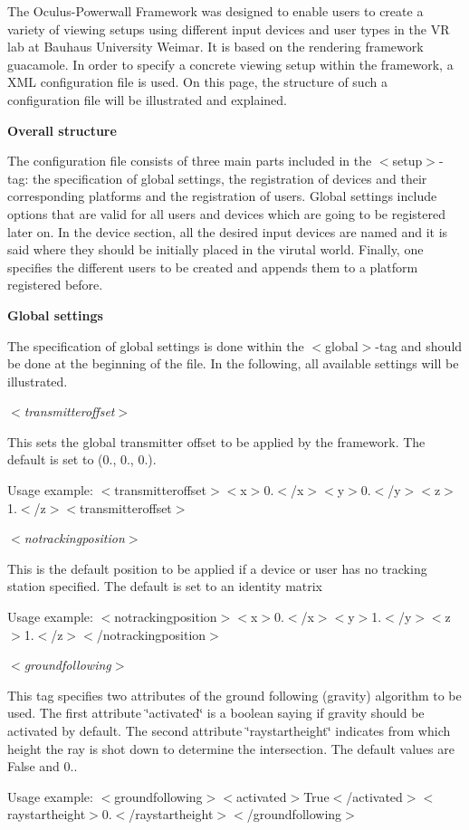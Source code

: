 \-The \-Oculus-\/\-Powerwall \-Framework was designed to enable users to create a variety of viewing setups using different input devices and user types in the \-V\-R lab at \-Bauhaus \-University \-Weimar. \-It is based on the rendering framework guacamole. \-In order to specify a concrete viewing setup within the framework, a \-X\-M\-L configuration file is used. \-On this page, the structure of such a configuration file will be illustrated and explained.

\par
 {\bfseries \-Overall structure}\par
 \-The configuration file consists of three main parts included in the $<$setup$>$-\/tag\-: the specification of global settings, the registration of devices and their corresponding platforms and the registration of users. \-Global settings include options that are valid for all users and devices which are going to be registered later on. \-In the device section, all the desired input devices are named and it is said where they should be initially placed in the virutal world. \-Finally, one specifies the different users to be created and appends them to a platform registered before.\par
\par


{\bfseries \-Global settings}\par
 \-The specification of global settings is done within the $<$global$>$-\/tag and should be done at the beginning of the file. \-In the following, all available settings will be illustrated.

{\itshape $<$transmitteroffset$>$\/}\par
 \-This sets the global transmitter offset to be applied by the framework. \-The default is set to (0., 0., 0.).\par
 \-Usage example\-: {\ttfamily  $<$transmitteroffset$>$$<$x$>$0.$<$/x$>$$<$y$>$0.$<$/y$>$$<$z$>$1.$<$/z$>$$<$transmitteroffset$>$}

{\itshape $<$notrackingposition$>$\/}\par
 \-This is the default position to be applied if a device or user has no tracking station specified. \-The default is set to an identity matrix\par
 \-Usage example\-: {\ttfamily $<$notrackingposition$>$$<$x$>$0.$<$/x$>$$<$y$>$1.$<$/y$>$$<$z$>$1.$<$/z$>$$<$/notrackingposition$>$}

{\itshape $<$groundfollowing$>$\/}\par
 \-This tag specifies two attributes of the ground following (gravity) algorithm to be used. \-The first attribute \char`\"{}activated\char`\"{} is a boolean saying if gravity should be activated by default. \-The second attribute \char`\"{}raystartheight\char`\"{} indicates from which height the ray is shot down to determine the intersection. \-The default values are \-False and 0..\par
 \-Usage example\-: {\ttfamily $<$groundfollowing$>$$<$activated$>$\-True$<$/activated$>$$<$raystartheight$>$0.$<$/raystartheight$>$$<$/groundfollowing$>$}

